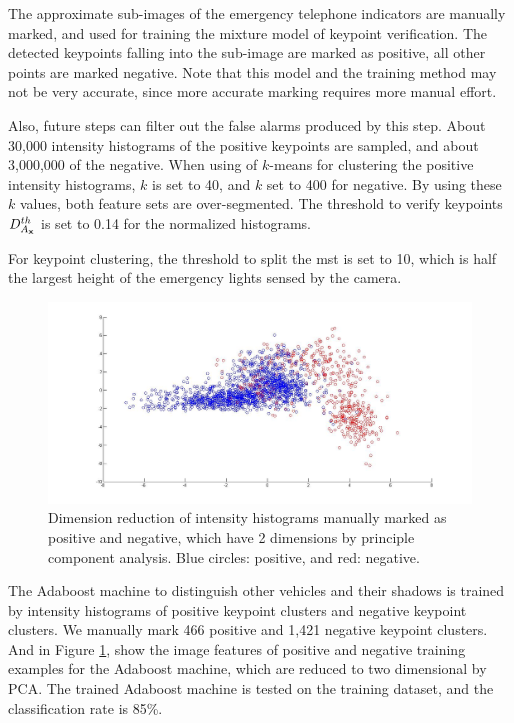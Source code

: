   The approximate sub-images of the emergency telephone indicators are manually marked, and used for training the mixture model of keypoint verification. The detected keypoints falling into the sub-image are marked as positive, all other points are marked negative. Note that this model and the training method may not be very accurate, since more accurate marking requires more manual effort.

  Also, future steps can filter out the false alarms produced by this step.  About 30,000 intensity histograms of the positive keypoints are sampled, and about 3,000,000 of the negative. When using of $k$-means for clustering the positive intensity histograms, $k$ is set to 40, and $k$ set to 400 for negative. By using these $k$ values,  both feature sets are over-segmented. The threshold to verify keypoints $D^{th}_{A_{\bf{x}}}$ is set to 0.14 for the normalized histograms.




For keypoint clustering, the threshold to split the mst is set to 10, which is half the largest height of the emergency lights sensed by the camera.

\begin{figure}
\includegraphics[width=1\textwidth,bb=0 0 1367 651]{untitled.jpg}
\caption[Positive and negative training examples]{Dimension reduction of intensity histograms manually marked as positive and negative, which have 2 dimensions by principle component analysis. Blue circles: positive, and red: negative.}
\label{ex1:v}
\end{figure}




 The Adaboost machine to distinguish other vehicles and their shadows is trained by intensity histograms of positive keypoint clusters and negative keypoint clusters. We manually mark 466 positive  and 1,421 negative keypoint clusters. And in Figure \ref{ex1:v}, show the image features of positive and negative training examples for the Adaboost machine, which are reduced to two dimensional by PCA. The trained Adaboost machine is tested on the training dataset, and the classification rate is 85\%.

